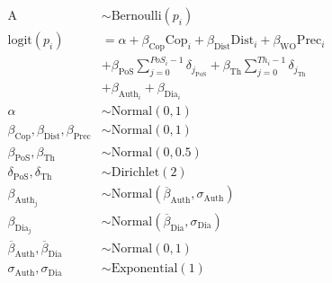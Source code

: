 \documentclass[a4paper, 12pt, article]{memoir}
\begin{document}
\begin{align*}
	\text{A} &\sim \text{Bernoulli}(p_i)\\
	\text{logit}(p_i) &= \alpha + 
	\beta_{\text{Cop}}\text{Cop}_i + 
	\beta_{\text{Dist}}\text{Dist}_i + \beta_{\text{WO}} \text{Prec}_i \\&+
		\beta_{\text{PoS}}\sum^{PoS_i-1}_{j=0}{\delta_j_{\text{PoS}}} + \beta_{\text{Th}}\sum^{Th_i-1}_{j=0}{\delta_j_{\text{Th}}} \\&+
		\beta_{\text{Auth}_i} + \beta_{\text{Dia}_i}\\
	\alpha &\sim \text{Normal}(0, 1)\\
	\beta_{\text{Cop}}, \beta_{\text{Dist}}, \beta_{\text{Prec}} &\sim \text{Normal}(0, 1)\\
	\beta_{\text{PoS}}, \beta_{\text{Th}} &\sim \text{Normal}(0, 0.5)\\
	\delta_{\text{PoS}}, \delta_{\text{Th}} &\sim \text{Dirichlet}(2)\\
	\beta_{\text{Auth}_j} &\sim \text{Normal}(\overline{\beta}_{\text{Auth}},
	\sigma_{\text{Auth}})\\
	\beta_{\text{Dia}_j} &\sim \text{Normal}(\overline{\beta}_{\text{Dia}}, \sigma_{\text{Dia}})\\
	\overline{\beta}_{\text{Auth}}, \overline{\beta}_{\text{Dia}} &\sim \text{Normal}(0, 1)\\
	\sigma_{\text{Auth}}, \sigma_{\text{Dia}} &\sim \text{Exponential}(1)\\
\end{align*}



\end{document}
